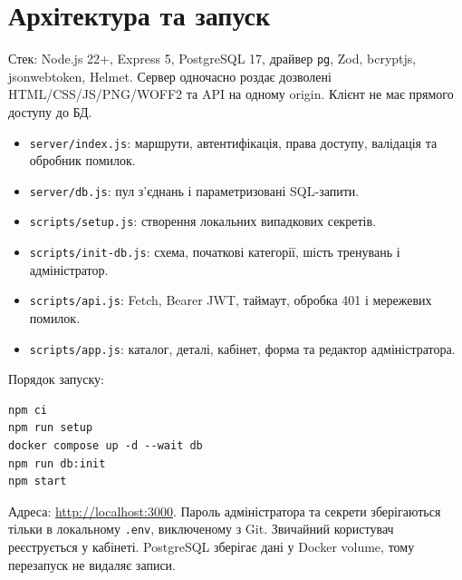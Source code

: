 \documentclass[12pt,a4paper]{article}
\newcommand{\file}[1]{\texttt{#1}}
\begin{document}
\section{Архітектура та запуск}
Стек: Node.js 22+, Express 5, PostgreSQL 17, драйвер \file{pg}, Zod, bcryptjs, jsonwebtoken, Helmet. Сервер одночасно роздає дозволені HTML/CSS/JS/PNG/WOFF2 та API на одному origin. Клієнт не має прямого доступу до БД.
\begin{center}\end{center}
\begin{itemize}
\item \file{server/index.js}: маршрути, автентифікація, права доступу, валідація та обробник помилок.
\item \file{server/db.js}: пул з'єднань і параметризовані SQL-запити.
\item \file{scripts/setup.js}: створення локальних випадкових секретів.
\item \file{scripts/init-db.js}: схема, початкові категорії, шість тренувань і адміністратор.
\item \file{scripts/api.js}: Fetch, Bearer JWT, таймаут, обробка 401 і мережевих помилок.
\item \file{scripts/app.js}: каталог, деталі, кабінет, форма та редактор адміністратора.
\end{itemize}
Порядок запуску:
\begin{verbatim}
npm ci
npm run setup
docker compose up -d --wait db
npm run db:init
npm start
\end{verbatim}
Адреса: \url{http://localhost:3000}. Пароль адміністратора та секрети зберігаються тільки в локальному \file{.env}, виключеному з Git. Звичайний користувач реєструється у кабінеті. PostgreSQL зберігає дані у Docker volume, тому перезапуск не видаляє записи.
\end{document}

